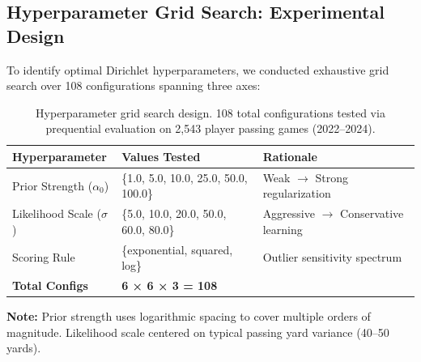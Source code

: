 \subsection{Hyperparameter Grid Search: Experimental Design}
\label{subsec:grid-search-design}

To identify optimal Dirichlet hyperparameters, we conducted exhaustive grid search over 108 configurations spanning three axes:

\begin{table}[h]
\centering
\caption[Dirichlet hyperparameter search space]{Hyperparameter grid search design. 108 total configurations tested via prequential evaluation on 2,543 player passing games (2022--2024).}
\label{tab:grid-search-space}
\begin{threeparttable}
\begin{tabular}{@{}lll@{}}
\toprule
\textbf{Hyperparameter} & \textbf{Values Tested} & \textbf{Rationale} \\
\midrule
Prior Strength ($\alpha_0$) & \{1.0, 5.0, 10.0, 25.0, 50.0, 100.0\} & Weak $\to$ Strong regularization \\
Likelihood Scale ($\sigma$) & \{5.0, 10.0, 20.0, 50.0, 60.0, 80.0\} & Aggressive $\to$ Conservative learning \\
Scoring Rule & \{exponential, squared, log\} & Outlier sensitivity spectrum \\
\midrule
\textbf{Total Configs} & \textbf{6 × 6 × 3 = 108} & \\
\bottomrule
\end{tabular}
\begin{tablenotes}
\footnotesize
\item \textbf{Note:} Prior strength uses logarithmic spacing to cover multiple orders of magnitude. Likelihood scale centered on typical passing yard variance (40--50 yards).
\end{tablenotes}
\end{threeparttable}
\end{table}

